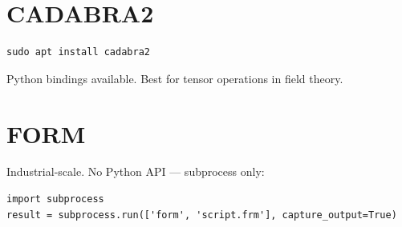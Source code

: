 \section{CADABRA2}

\begin{verbatim}
sudo apt install cadabra2
\end{verbatim}

Python bindings available. Best for tensor operations in field theory.

\section{FORM}

Industrial-scale. No Python API — subprocess only:
\begin{verbatim}
import subprocess
result = subprocess.run(['form', 'script.frm'], capture_output=True)
\end{verbatim}
